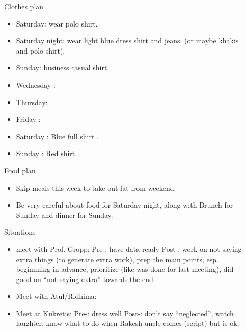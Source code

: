 \documentclass[serif,mathserif,final]{beamer}
\begin{document}
\begin{frame}{}
\begin{columns}[t]
\begin{column}{0.25\linewidth}
  \begin{block}{ Clothes plan } 
    \begin{itemize} 
    \tiny \item \tiny Saturday: wear polo shirt. 
    \item \tiny Saturday night: wear light blue dress shirt and jeans. (or maybe khakis and polo shirt). 
    \item \tiny Sunday: business casual shirt. 
    \item \tiny Wednesday : 
    \item \tiny Thursday: 
    \item \tiny Friday : 
    \item \tiny Saturday : Blue full shirt . 
    \item \tiny Sunday : Red shirt .
    \end{itemize} 
  \end{block} 

  \begin{block}{ Food plan } 
    \begin{itemize} 
      \tiny \item \tiny Skip meals this week to take out fat from weekend. 
    \item \tiny Be very careful about food for Saturday night, along with Brunch for Sunday and dinner for Sunday. 
    \end{itemize} 
  \end{block} 
  \begin{block}{ Situations} 
    \begin{itemize} 
    \item \tiny meet with Prof. Gropp: Pre-: have data ready Post-: work on not saying extra things (to generate extra work), prep the main points, esp. beginnning in advance, prioritize (like was done for last meeting), did good on ``not saying extra''  towards the end 
      \item \tiny Meet with Atul/Ridhima: 
        \item \tiny Meet at Kukretis: Pre-: dress well Post-: don't say ``neglected'', watch laughter, know what to do when Rakesh uncle comes (script) but is ok, 
    \end{itemize}
  \end{block} 
\end{column} %
\begin{column}{0.50\linewidth}


\end{column}
\end{columns}
\end{frame}
\end{document}
